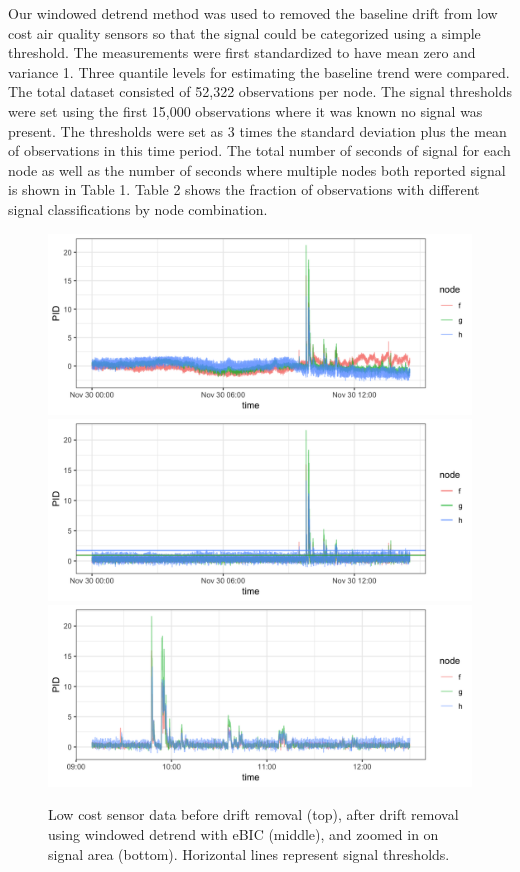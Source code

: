 \documentclass[12pt]{article}
\begin{document}
	
	Our windowed detrend method was used to removed the baseline drift from low cost air quality sensors so that the signal could be categorized using a simple threshold. The measurements were first standardized to have mean zero and variance 1. Three quantile levels for estimating the baseline trend were compared. The total dataset consisted of 52,322 observations per node. 
	The signal thresholds were set using the first 15,000 observations where it was known no signal was present. The thresholds were set as 3 times the standard deviation plus the mean of observations in this time period. The total number of seconds of signal for each node as well as the number of seconds where multiple nodes both reported signal is shown in Table 1. Table 2 shows the fraction of observations with different signal classifications by node combination. 
	
	\begin{figure}
		\caption{Low cost sensor data before drift removal (top), after drift removal using windowed detrend with eBIC (middle), 
			and zoomed in on signal area (bottom). Horizontal lines represent signal thresholds.}
		\includegraphics[width = \linewidth]{Figures/uncorrected_data.png}
		\includegraphics[width = \linewidth]{Figures/corrected_data.png}
		\includegraphics[width = \linewidth]{Figures/corrected_zoom_data.png}
	\end{figure}
\end{document}
